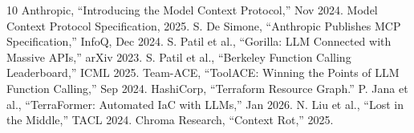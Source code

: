 \documentclass[10pt,twocolumn]{article}
\begin{document}
\begin{thebibliography}{10}
\small
{} Anthropic, ``Introducing the Model Context Protocol,'' Nov 2024.
 Model Context Protocol Specification, 2025.
 S. De Simone, ``Anthropic Publishes MCP Specification,'' InfoQ, Dec 2024.
 S. Patil et al., ``Gorilla: LLM Connected with Massive APIs,'' arXiv 2023.
 S. Patil et al., ``Berkeley Function Calling Leaderboard,'' ICML 2025.
 Team-ACE, ``ToolACE: Winning the Points of LLM Function Calling,'' Sep 2024.
 HashiCorp, ``Terraform Resource Graph.''
 P. Jana et al., ``TerraFormer: Automated IaC with LLMs,'' Jan 2026.
 N. Liu et al., ``Lost in the Middle,'' TACL 2024.
 Chroma Research, ``Context Rot,'' 2025.
\end{thebibliography}
\end{document}
